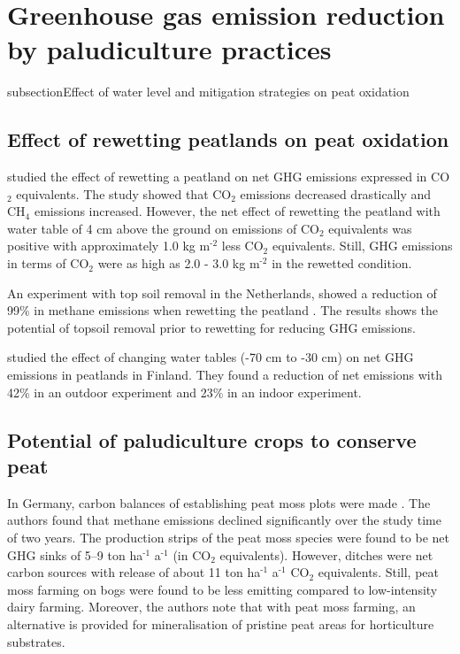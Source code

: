 \documentclass[a4paper,12pt]{scrbook}
\newcommand{\sur}[1]{\ensuremath{^{\textrm{#1}}}}
\newcommand{\sous}[1]{\ensuremath{_{\textrm{#1}}}}
\begin{document}
\section{Greenhouse gas emission reduction by paludiculture practices}
subsection{Effect of water level and mitigation strategies on peat oxidation}

\subsection{Effect of rewetting peatlands on peat oxidation}

\citet{van2013rewetting} studied the effect of rewetting a peatland on net GHG emissions expressed in CO\sous{2} equivalents. The study showed that CO\sous{2} emissions decreased drastically and CH\sous{4} emissions increased. However, the net effect of rewetting the peatland with water table of 4 cm above the ground on emissions of CO\sous{2} equivalents was positive with approximately 1.0 kg m\sur{-2} less CO\sous{2} equivalents. Still, GHG emissions in terms of CO\sous{2} were as high as 2.0 - 3.0 kg m\sur{-2} in the rewetted condition. 

An experiment with top soil removal in the Netherlands, showed a reduction of 99\% in methane emissions when rewetting the peatland \citep{harpenslager2015rewetting}. The results shows the potential of topsoil removal prior to rewetting for reducing GHG emissions. 

\citet{Regina2015} studied the effect of changing water tables (-70 cm to -30 cm) on net GHG emissions in peatlands in Finland. They found a reduction of net emissions with 42\% in an outdoor experiment and 23\% in an indoor experiment.  

\subsection{Potential of paludiculture crops to conserve peat}

In Germany, carbon balances of establishing peat moss plots were made \citep{gunther2017greenhouse}. The authors found that methane emissions declined significantly over the study time of two years. The production strips of the peat moss  species were found to be net GHG sinks of 5–9 ton ha\sur{-1} a\sur{-1} (in CO\sous{2} equivalents). However, ditches were net carbon sources with release of about 11 ton ha\sur{-1} a\sur{-1} CO\sous{2} equivalents. Still, peat moss farming on bogs were found to be less emitting compared to low-intensity dairy farming. Moreover, the authors note that with peat moss farming, an alternative is provided for mineralisation of pristine peat areas for horticulture substrates.
 
\end{document}
